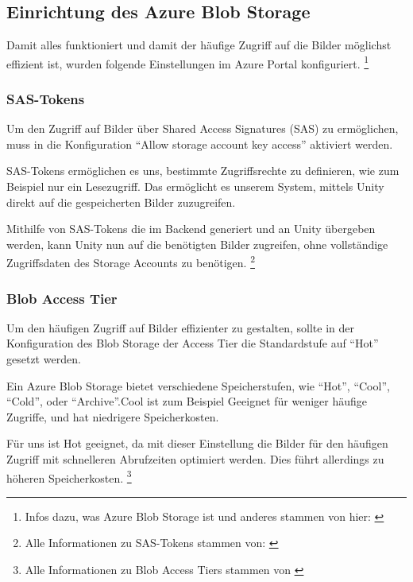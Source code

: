 \subsection{Einrichtung des Azure Blob Storage}
\label{subsection:azure-blob-storage-getting-started}

Damit alles funktioniert und damit der häufige Zugriff auf die Bilder
möglichst effizient ist, wurden folgende Einstellungen im Azure Portal
konfiguriert. \footnote{Infos dazu, was Azure Blob Storage ist und anderes stammen von hier: \cite{MicrosoftCorporationd}}

\subsubsection{SAS-Tokens}

Um den Zugriff auf Bilder über Shared Access Signatures (SAS) zu ermöglichen, muss in 
die Konfiguration ``Allow storage account key access'' aktiviert werden.

SAS-Tokens ermöglichen es uns, bestimmte Zugriffsrechte zu definieren, wie zum Beispiel
nur ein Lesezugriff. Das ermöglicht es unserem System, mittels Unity direkt auf die
gespeicherten Bilder zuzugreifen.

Mithilfe von SAS-Tokens die im Backend generiert und an Unity übergeben werden, 
kann Unity nun auf die benötigten Bilder zugreifen, ohne vollständige Zugriffsdaten 
des Storage Accounts zu benötigen. \footnote{Alle Informationen zu SAS-Tokens stammen von: \cite{MicrosoftCorporationa}}


\subsubsection{Blob Access Tier}

Um den häufigen Zugriff auf Bilder effizienter zu gestalten, sollte in der Konfiguration 
des Blob Storage der Access Tier die Standardstufe auf ``Hot'' gesetzt werden.

Ein Azure Blob Storage bietet verschiedene Speicherstufen, wie ``Hot'', ``Cool'', ``Cold'',
oder ``Archive''.Cool ist zum Beispiel Geeignet für weniger häufige Zugriffe, und hat
niedrigere Speicherkosten. 

Für uns ist Hot geeignet, da mit dieser Einstellung die Bilder
für den häufigen Zugriff mit schnelleren Abrufzeiten optimiert werden. Dies führt allerdings
zu höheren Speicherkosten. \footnote{Alle Informationen zu Blob Access Tiers stammen von \cite{MicrosoftCorporationb}}


